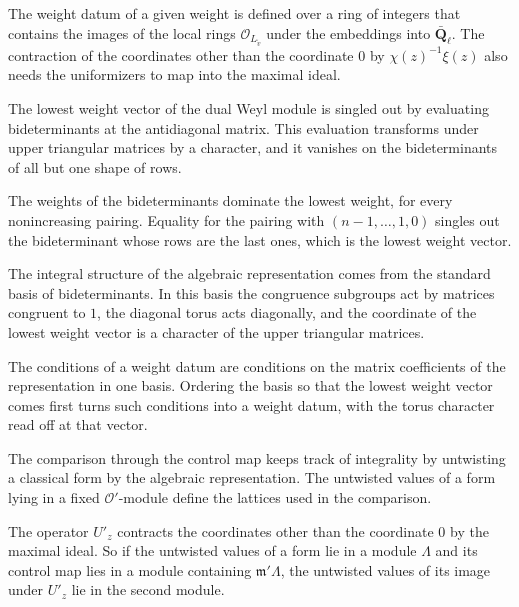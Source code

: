 The weight datum of a given weight is defined over a ring of integers that contains the images of the local rings $\mathcal O_{L_{\tilde v}}$ under the embeddings into $\bar{\mathbf Q}_\ell$. The contraction of the coordinates other than the coordinate $0$ by $\chi(z)^{-1}\xi(z)$ also needs the uniformizers to map into the maximal ideal.

The lowest weight vector of the dual Weyl module is singled out by evaluating bideterminants at the antidiagonal matrix. This evaluation transforms under upper triangular matrices by a character, and it vanishes on the bideterminants of all but one shape of rows.

The weights of the bideterminants dominate the lowest weight, for every nonincreasing pairing. Equality for the pairing with $(n-1,\dots,1,0)$ singles out the bideterminant whose rows are the last ones, which is the lowest weight vector.

The integral structure of the algebraic representation comes from the standard basis of bideterminants. In this basis the congruence subgroups act by matrices congruent to $1$, the diagonal torus acts diagonally, and the coordinate of the lowest weight vector is a character of the upper triangular matrices.

The conditions of a weight datum are conditions on the matrix coefficients of the representation in one basis. Ordering the basis so that the lowest weight vector comes first turns such conditions into a weight datum, with the torus character read off at that vector.

The comparison through the control map keeps track of integrality by untwisting a classical form by the algebraic representation. The untwisted values of a form lying in a fixed $\mathcal O'$-module define the lattices used in the comparison.

The operator $U'_z$ contracts the coordinates other than the coordinate $0$ by the maximal ideal. So if the untwisted values of a form lie in a module $\Lambda$ and its control map lies in a module containing $\mathfrak m'\Lambda$, the untwisted values of its image under $U'_z$ lie in the second module.


